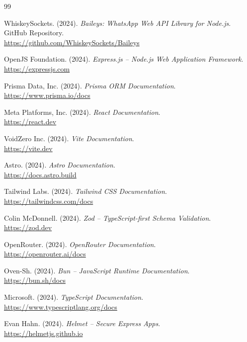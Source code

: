 \documentclass[12pt,a4paper,oneside]{article}
\begin{document}
\newpage
\begin{thebibliography}{99}
	\raggedright

	WhiskeySockets. (2024). \textit{Baileys: WhatsApp Web API Library for Node.js}. GitHub Repository. \\
	\url{https://github.com/WhiskeySockets/Baileys}

	OpenJS Foundation. (2024). \textit{Express.js -- Node.js Web Application Framework}. \\
	\url{https://expressjs.com}

	Prisma Data, Inc. (2024). \textit{Prisma ORM Documentation}. \\
	\url{https://www.prisma.io/docs}

	Meta Platforms, Inc. (2024). \textit{React Documentation}. \\
	\url{https://react.dev}

	VoidZero Inc. (2024). \textit{Vite Documentation}. \\
	\url{https://vite.dev}

	Astro. (2024). \textit{Astro Documentation}. \\
	\url{https://docs.astro.build}

	Tailwind Labs. (2024). \textit{Tailwind CSS Documentation}. \\
	\url{https://tailwindcss.com/docs}

	Colin McDonnell. (2024). \textit{Zod -- TypeScript-first Schema Validation}. \\
	\url{https://zod.dev}

	OpenRouter. (2024). \textit{OpenRouter Documentation}. \\
	\url{https://openrouter.ai/docs}

	Oven-Sh. (2024). \textit{Bun -- JavaScript Runtime Documentation}. \\
	\url{https://bun.sh/docs}

	Microsoft. (2024). \textit{TypeScript Documentation}. \\
	\url{https://www.typescriptlang.org/docs}

	Evan Hahn. (2024). \textit{Helmet -- Secure Express Apps}. \\
	\url{https://helmetjs.github.io}


\end{thebibliography}
\end{document}
